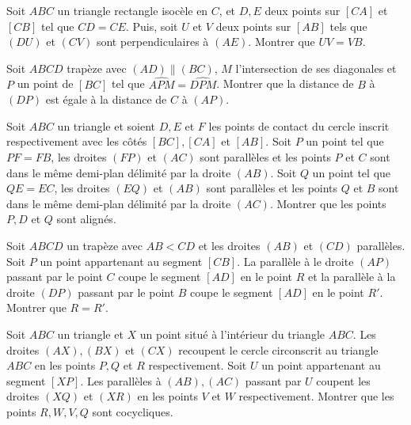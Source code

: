 \begin{exo}
Soit $ABC$ un triangle rectangle isocèle en $C$, et $D,E$ deux points sur $[CA]$ et $[CB]$ tel que $CD=CE$. Puis, soit $U$ et $V$ deux points sur $[AB]$ tels que $(DU)$ et $(CV)$ sont perpendiculaires à $(AE)$. Montrer que $UV=VB$.
\end{exo}

\begin{exo}

Soit $ABCD$ trapèze avec $(AD) \parallel (BC)$, $M$ l’intersection de ses diagonales et $P$ un point de $[BC]$ tel que $\widehat{APM}=\widehat{DPM}$. Montrer que la distance de $B$ à $(DP)$ est égale à la distance de $C$ à $(AP)$.
\end{exo}

\begin{exo}
Soit $ABC$ un triangle et soient $D,E$ et $F$ les points de contact du cercle inscrit respectivement avec les côtés $[BC], [CA]$ et $[AB]$. Soit $P$ un point tel que $PF=FB$, les droites $(FP)$ et $(AC)$ sont parallèles et les points $P$ et $C$ sont dans le même demi-plan délimité par la droite $(AB)$. Soit $Q$ un point tel que $QE=EC$, les droites $(EQ)$ et $(AB)$ sont parallèles et les points $Q$ et $B$ sont dans le même demi-plan délimité par la droite $(AC)$. Montrer que les points $P, D$ et $Q$ sont alignés.
\end{exo}

\begin{exo}
Soit $ABCD$ un trapèze avec $AB<CD$ et les droites $(AB)$ et $(CD)$ parallèles. Soit $P$ un point appartenant au segment $[CB]$. La parallèle à le droite $(AP)$ passant par le point $C$ coupe le segment $[AD]$ en le point $R$ et la parallèle à la droite $(DP)$ passant par le point $B$ coupe le segment $[AD]$ en le point $R'$. Montrer que $R=R'$.
\end{exo}

\begin{exo}
Soit $ABC$ un triangle et $X$ un point situé à l'intérieur du triangle $ABC$. Les droites $(AX), (BX)$ et $(CX)$ recoupent le cercle circonscrit au triangle $ABC$ en les points $P,Q$ et $R$ respectivement. Soit $U$ un point appartenant au segment $[XP]$. Les parallèles à $(AB),(AC)$ passant par $U$ coupent les droites $(XQ)$ et $(XR)$ en les points $V$ et $W$ respectivement. Montrer que les points $R,W,V,Q$ sont cocycliques.
\end{exo}

\newpage


